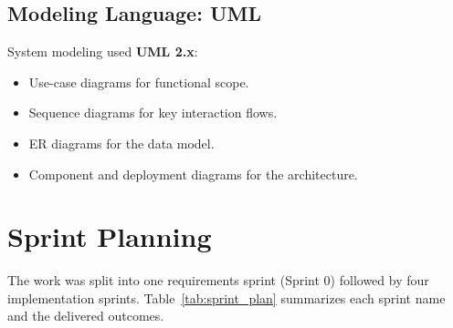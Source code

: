 \subsection{Modeling Language: UML}

System modeling used \textbf{UML 2.x}:
\begin{itemize}
  \item Use-case diagrams for functional scope.
  \item Sequence diagrams for key interaction flows.
  \item ER diagrams for the data model.
  \item Component and deployment diagrams for the architecture.
\end{itemize}

\section{Sprint Planning}

The work was split into one requirements sprint (Sprint 0) followed by four implementation sprints.
Table~\ref{tab:sprint_plan} summarizes each sprint name and the delivered outcomes.

